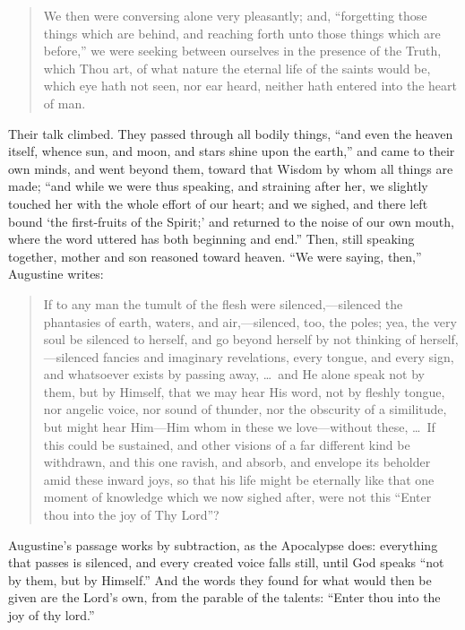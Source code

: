 \begin{quote}
We then were conversing alone very pleasantly; and, ``forgetting those things which are behind, and reaching forth unto those things which are before,'' we were seeking between ourselves in the presence of the Truth, which Thou art, of what nature the eternal life of the saints would be, which eye hath not seen, nor ear heard, neither hath entered into the heart of man.
\end{quote}

Their talk climbed. They passed through all bodily things, ``and even the heaven itself, whence sun, and moon, and stars shine upon the earth,'' and came to their own minds, and went beyond them, toward that Wisdom by whom all things are made; ``and while we were thus speaking, and straining after her, we slightly touched her with the whole effort of our heart; and we sighed, and there left bound `the first-fruits of the Spirit;' and returned to the noise of our own mouth, where the word uttered has both beginning and end.'' Then, still speaking together, mother and son reasoned toward heaven. ``We were saying, then,'' Augustine writes:

\begin{quote}
If to any man the tumult of the flesh were silenced,---silenced the phantasies of earth, waters, and air,---silenced, too, the poles; yea, the very soul be silenced to herself, and go beyond herself by not thinking of herself,---silenced fancies and imaginary revelations, every tongue, and every sign, and whatsoever exists by passing away, \ldots\ and He alone speak not by them, but by Himself, that we may hear His word, not by fleshly tongue, nor angelic voice, nor sound of thunder, nor the obscurity of a similitude, but might hear Him---Him whom in these we love---without these, \ldots\ If this could be sustained, and other visions of a far different kind be withdrawn, and this one ravish, and absorb, and envelope its beholder amid these inward joys, so that his life might be eternally like that one moment of knowledge which we now sighed after, were not this ``Enter thou into the joy of Thy Lord''?
\end{quote}

Augustine's passage works by subtraction, as the Apocalypse does: everything that passes is silenced, and every created voice falls still, until God speaks ``not by them, but by Himself.'' And the words they found for what would then be given are the Lord's own, from the parable of the talents: ``Enter thou into the joy of thy lord.''

